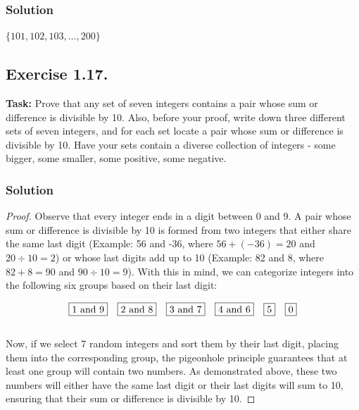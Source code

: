 \documentclass{article}
\begin{document}
\subsubsection*{Solution}

$\{101, 102, 103, \ldots, 200\}$

\newpage

\subsection{Exercise 1.17.} 
\textbf{Task:} Prove that any set of seven integers contains a pair whose sum or difference is divisible by 10. Also, before your proof, write down three different sets of seven integers, and for each set locate a pair whose sum or difference is divisible by 10. Have your sets contain a diverse collection of integers - some bigger, some smaller, some positive, some negative.

\subsubsection*{Solution}

\begin{proof}
Observe that every integer ends in a digit between 0 and 9. A pair whose sum or difference is divisible by 10 is formed from two integers that either share the same last digit (Example: 56 and -36, where $56 + (-36) = 20$ and $20 \div 10 = 2$) or whose last digits add up to 10 (Example: 82 and 8, where $82 + 8 = 90$ and $90 \div 10 = 9$). With this in mind, we can categorize integers into the following six groups based on their last digit:

    \[
    \fbox{1 and 9} \quad \fbox{2 and 8} \quad \fbox{3 and 7} \quad \fbox{4 and 6} \quad \fbox{5} \quad \fbox{0}
    \]\\

Now, if we select 7 random integers and sort them by their last digit, placing them into the corresponding group, the pigeonhole principle guarantees that at least one group will contain two numbers. As demonstrated above, these two numbers will either have the same last digit or their last digits will sum to 10, ensuring that their sum or difference is divisible by 10.

\end{proof}

\newpage
\end{document}
